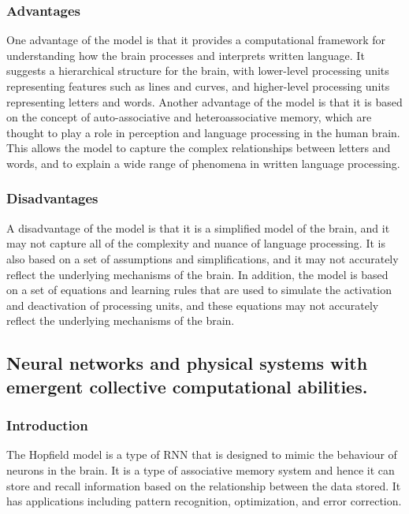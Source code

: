 \subsubsection{Advantages }
One advantage of the model is that it provides a computational framework for
understanding how the brain processes and interprets written language. It
suggests a hierarchical structure for the brain, with lower-level processing
units representing features such as lines and curves, and higher-level
processing units representing letters and words. Another advantage of the model
is that it is based on the concept of auto-associative and heteroassociative
memory, which are thought to play a role in perception and language processing
in the human brain. This allows the model to capture the complex relationships
between letters and words, and to explain a wide range of phenomena in written
language processing.

\subsubsection{Disadvantages}
A disadvantage of the model is that it is a simplified model of the brain, and
it may not capture all of the complexity and nuance of language processing. It
is also based on a set of assumptions and simplifications, and it may not
accurately reflect the underlying mechanisms of the brain. In addition, the
model is based on a set of equations and learning rules that are used to
simulate the activation and deactivation of processing units, and these
equations may not accurately reflect the underlying mechanisms of the brain.

\subsection{Neural networks and physical systems with emergent collective computational abilities.}
\subsubsection{Introduction}
The Hopfield model\cite{hopfield} is a type of RNN that is designed to mimic
the behaviour of neurons in the brain. It is a type of associative memory
system and hence it can store and recall information based on the relationship
between the data stored. It has applications including pattern recognition,
optimization, and error correction.
